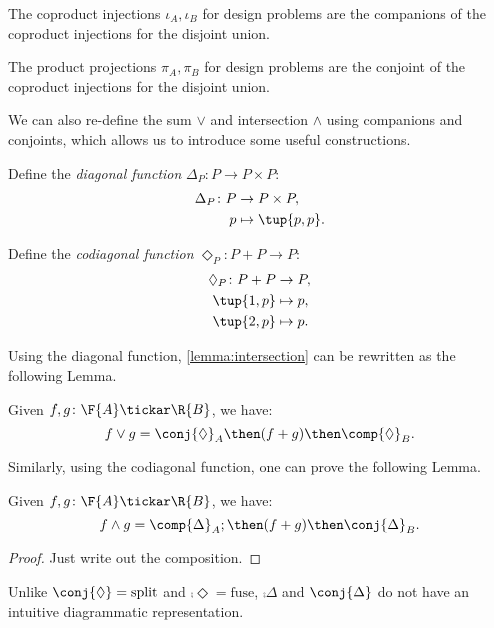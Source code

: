 \begin{example}The coproduct injections $\iota_A, \iota_B$ for design problems are the companions of the coproduct injections for the disjoint union.
\end{example}

\begin{example}The product projections $\pi_A, \pi_B$ for design problems are the conjoint of the coproduct injections for the disjoint union.\end{example}

We can also re-define the sum $\vee$ and intersection $\wedge$ using companions and conjoints, which allows us to introduce some useful constructions.

\begin{definition}
Define the \emph{diagonal function} $\Delta_P\colon P \to P \times P$:
\begin{equation}
\begin{aligned}
    \Delta_P \colon P & \to P \times P, \\
             p & \mapsto \tup{p, p}.
\end{aligned}
\end{equation}
\end{definition}

\begin{definition}
Define the \emph{codiagonal function} $\Diamond_P\colon P+P \to P $:
\begin{equation}
\begin{aligned}
    \Diamond_P \colon P + P & \to P,  \\
            \tup{1,p} & \mapsto p, \\
            \tup{2,p} & \mapsto p.
\end{aligned}
\end{equation}
\end{definition}

Using the diagonal function, \cref{lemma:intersection} can be rewritten as the following Lemma.

\begin{lemma}
    Given $f, g\colon \F{A} \tickar \R{B}$, we have:
    \begin{equation}
        f \vee g =  \conj{\Diamond}_A \then (f + g)\then \comp{\Diamond}_B.
    \end{equation}
\end{lemma}

Similarly, using the codiagonal function, one can prove the following Lemma.
\begin{lemma}
    Given $f, g\colon \F{A} \tickar \R{B}$, we have:
    \begin{equation}
        f \wedge g = \comp{\Delta}_A ;\then(f + g) \then \conj{\Delta}_B.
    \end{equation}
\end{lemma}
\begin{proof}Just write out the composition.\end{proof}
Unlike $\conj{\Diamond} = \text{split}$ and $\comp{\Diamond} = \text{fuse}$, $\comp{\Delta}$ and $\conj{\Delta}$ do not have an intuitive diagrammatic representation.